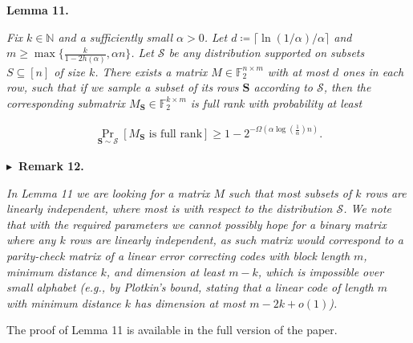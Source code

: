 

\par\medskip\noindent\textbf{
\textbf{Lemma 11}\textbf{.}
}\par



\emph{Fix $k\in\mathbb{N}$ and a sufficiently small $\alpha>0$.
Let $d\coloneq\lceil\ln(1/\alpha)/\alpha\rceil$ and $m\geq\max\{\frac{k}{1-2h(\alpha)},\alpha n\}$.
Let $\mathcal{S}$ be any distribution supported on subsets $S\subseteq[n]$ of size $k$.
There exists a matrix $M\in\mathbb{F}_{2}^{n\times m}$ with at most $d$ ones in each row, such that if we sample a subset of its rows $\boldsymbol{S}$ according to $\mathcal{S}$, then the corresponding submatrix $M_{\boldsymbol{S}}\in\mathbb{F}_{2}^{k\times m}$ is full rank with probability at least}\par


\[\begin{gathered}
\Pr_{\boldsymbol{S}\sim\mathcal{S}}\left[\text{$M_{\boldsymbol{S}}$ is full rank}\right]\geq 1-2^{-\Omega(\alpha\log(\frac{1}{\alpha})n)}.
\end{gathered}\]







\par\medskip\noindent\textbf{
$\blacktriangleright$ Remark 12.
}\par



\emph{In Lemma 11 we are looking for a matrix $M$ such that most subsets of $k$ rows are linearly independent, where most is with respect to the distribution $\mathcal{S}$. We note that with the required parameters we cannot possibly hope for a binary matrix where any $k$ rows are linearly independent, as such matrix would correspond to a parity-check matrix of a linear error correcting codes with block length $m$, minimum distance $k$, and dimension at least $m-k$, which is impossible over small alphabet (e.g., by Plotkin’s bound, stating that a linear code of length $m$ with minimum distance $k$ has dimension at most $m-2k+o(1)$).}\par






The proof of Lemma 11 is available in the full version of the paper.\par





